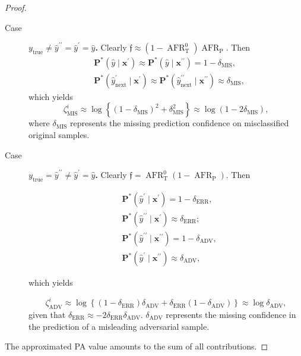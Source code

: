 \begin{proof}
\begin{description}
        \item[Case]$y_{\text{true}} \neq \hat{y}^{\prime \prime} = \hat{y}^{\prime} = \hat{y}$\textbf{.} Clearly $\mathfrak{f} \approx (1 - \operatorname{AFR}^0_{\text{T}})\operatorname{AFR}_{\text{P}}$. Then
        $$
        \begin{aligned}
            & \mathbf{P}^{*}(\hat{y} \mid \bm{x}^\prime) \approx \mathbf{P}^{*}(\hat{y} \mid \bm{x}^{\prime \prime}) = 1 - \delta_{\text{MIS}}, \\
            & \mathbf{P}^{*}(\hat{y}_{\text{next}}^{\prime}  \mid \bm{x}^\prime) \approx \mathbf{P}^{*}(\hat{y}_{\text{next}}^{\prime \prime}  \mid \bm{x}^{\prime \prime}) \approx \delta_{\text{MIS}},
        \end{aligned}
        $$
        which yields
        $$
        \zeta_{\text{MIS}}^i \approx \log \left\{ \left(1 - \delta_{\text{MIS}} \right)^2 +  \delta_{\text{MIS}}^ 2 \right\} \approx \log \left( 1 - 2\delta_{\text{MIS}} \right) ,
        $$
        where $\delta_{\text{MIS}}$ represents the missing prediction confidence on misclassified original samples.

        \item[Case]$y_{\text{true}} = \hat{y}^{\prime \prime} \neq \hat{y}^{\prime} = \hat{y}$\textbf{.} Clearly 
        $\mathfrak{f} = \operatorname{AFR}^0_{\text{T}} (1-\operatorname{AFR}_{\text{P}})$. Then
        
        $$
        \begin{aligned}
            & \mathbf{P}^{*}(\hat{y}^\prime \mid \bm{x}^\prime) = 1 - \delta_{\text{ERR}},  \\
            & \mathbf{P}^{*}(\hat{y}^{\prime \prime} \mid \bm{x}^\prime) \approx \delta_{\text{ERR}}; \\
            & \mathbf{P}^{*}(\hat{y}^{\prime \prime} \mid \bm{x}^{\prime \prime}) = 1 - \delta_{\text{ADV}}, \\
            & \mathbf{P}^{*}(\hat{y}^{\prime} \mid \bm{x}^{\prime \prime}) \approx \delta_{\text{ADV}},
        \end{aligned}
        $$

        which yields

        $$
        \zeta_{\text{ADV}}^i \approx \log \left\{ \left(1 - \delta_{\text{ERR}} \right) \delta_{\text{ADV}} + \delta_{\text{ERR}} \left(1 - \delta_{\text{ADV}} \right) \right\} \approx \log \delta_{\text{ADV}},
        $$
        given that $\delta_{\text{ERR}} \approx - 2 \delta_{\text{ERR}} \delta_{\text{ADV}}$. $\delta_{\text{ADV}}$ represents the missing confidence in 
        the prediction of a misleading adversarial sample.
    \end{description}

    The approximated PA value amounts to the sum of all contributions.
\end{proof}

